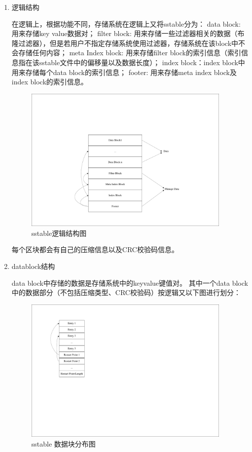 \begin{enumerate}
\begin{enumerate}
					\item 逻辑结构
	
					在逻辑上，根据功能不同，存储系统在逻辑上又将sstable分为：
	data block: 用来存储key value数据对；
	filter block: 用来存储一些过滤器相关的数据（布隆过滤器），但是若用户不指定存储系统使用过滤器，存储系统在该block中不会存储任何内容；
	meta Index block: 用来存储filter block的索引信息（索引信息指在该sstable文件中的偏移量以及数据长度）；
	index block：index block中用来存储每个data block的索引信息；
	footer: 用来存储meta index block及index block的索引信息。
	
	\begin{figure}[H]
		\centering
		\includegraphics[width=0.95\textwidth]{pdf/sstable_logic.pdf}
		\caption{sstable逻辑结构图}
		\label{sstable_logic}
	\end{figure}
	
				每个区块都会有自己的压缩信息以及CRC校验码信息。
	
					\item datablock结构
	
					data block中存储的数据是存储系统中的keyvalue键值对。
					其中一个data block中的数据部分（不包括压缩类型、CRC校验码）按逻辑又以下图进行划分：
					
					\begin{figure}[H]
						\centering
						\includegraphics[width=0.95\textwidth]{pdf/datablock.pdf}
						\caption{sstable 数据块分布图}
						\label{sstable_data_block}
					\end{figure}
					

\end{enumerate}
\end{enumerate}
